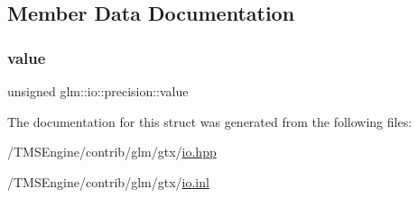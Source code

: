 \subsection{Member Data Documentation}
\mbox{\label{structglm_1_1io_1_1precision_a43da772dff9a209768c63f1220d52074}} 
\subsubsection{\texorpdfstring{value}{value}}
{\footnotesize\ttfamily unsigned glm\+::io\+::precision\+::value}



The documentation for this struct was generated from the following files\+:\begin{DoxyCompactItemize}
\item 
/\+T\+M\+S\+Engine/contrib/glm/gtx/\hyperlink{io_8hpp}{io.\+hpp}\item 
/\+T\+M\+S\+Engine/contrib/glm/gtx/\hyperlink{io_8inl}{io.\+inl}\end{DoxyCompactItemize}
